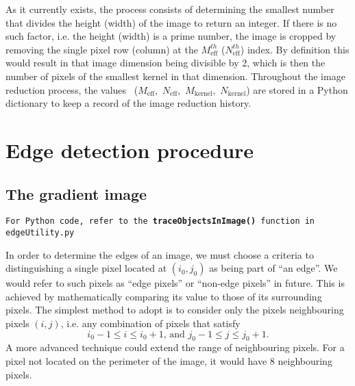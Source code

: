 \documentclass[11pt]{article}
\begin{document}
As it currently exists, the process consists of determining the smallest number that divides the height (width) of the image to return an integer. If there is no such factor, i.e. the height (width) is a prime number, the image is cropped by removing the single pixel row (column) at the $M_{\text{eff}}^{th}$ ($N_{\text{eff}}^{th}$) index. By definition this would result in that image dimension being divisible by 2, which is then the number of pixels of the smallest kernel in that dimension. Throughout the image reduction process, the values ~{($M_{\text{eff}}$,~$N_{\text{eff}}$,~$M_{\text{kernel}}$,~$N_{\text{kernel}}$)} are stored in a Python dictionary to keep a record of the image reduction history.




\section{Edge detection procedure}
\subsection{\label{sec:grad_img}The gradient image}
\begin{center}
\texttt{For Python code, refer to the {\bf traceObjectsInImage()} function in edgeUtility.py}
\end{center}
In order to determine the edges of an image, we must choose a criteria to distinguishing a single pixel located at $(i_0,j_0)$ as being part of ``an edge''. We would refer to such pixels as ``edge pixels'' or ``non-edge pixels'' in future. This is achieved by mathematically comparing its value to those of its surrounding pixels. The simplest method to adopt is to consider only the pixels neighbouring pixels $(i,j)$, i.e. any combination of pixels that satisfy
\begin{equation}
i_0-1 \leq i \leq i_0+1\text{, and }j_0-1 \leq j \leq j_0+1\text{.}
\end{equation}
A more advanced technique could extend the range of neighbouring pixels. For a pixel not located on the perimeter of the image, it would have 8 neighbouring pixels.
\end{document}
